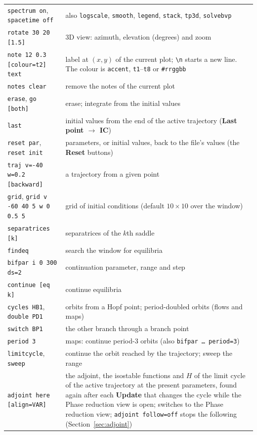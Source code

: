 \documentclass[11pt,a4paper]{article}
\newcommand{\ui}[1]{\textsf{\textbf{#1}}}          %
\begin{document}
{\begin{longtable}{@{}p{}p{}@{}}
\texttt{spectrum on}, \texttt{spacetime off} & also \texttt{logscale}, \texttt{smooth}, \texttt{legend}, \texttt{stack}, \texttt{tp3d}, \texttt{solvebvp}\\
\texttt{rotate 30 20 [1.5]} & 3D view: azimuth, elevation (degrees) and zoom\\
\texttt{note 12 0.3 [colour=t2] text} & label at $(x,y)$ of the current plot; \texttt{\textbackslash n} starts a new line. The colour is \texttt{accent}, \texttt{t1}--\texttt{t8} or \texttt{\#rrggbb}\\
\texttt{notes clear} & remove the notes of the current plot\\
\midrule
\texttt{erase}, \texttt{go [both]} & erase; integrate from the initial values\\
\texttt{last} & initial values from the end of the active trajectory (\ui{Last point $\to$ IC})\\
\texttt{reset par}, \texttt{reset init} & parameters, or initial values, back to the file's values (the \ui{Reset} buttons)\\
\texttt{traj v=-40 w=0.2 [backward]} & a trajectory from a given point\\
\texttt{grid}, \texttt{grid v -60 40 5 w 0 0.5 5} & grid of initial conditions (default $10\times10$ over the window)\\
\texttt{separatrices [k]} & separatrices of the $k$th saddle\\
\texttt{findeq} & search the window for equilibria\\
\midrule
\texttt{bifpar i 0 300 ds=2} & continuation parameter, range and step\\
\texttt{continue [eq k]} & continue equilibria\\
\texttt{cycles HB1}, \texttt{double PD1} & orbits from a Hopf point; period-doubled orbits (flows and maps)\\
\texttt{switch BP1} & the other branch through a branch point\\
\texttt{period 3} & maps: continue period-3 orbits (also \texttt{bifpar \ldots{} period=3})\\
\texttt{limitcycle}, \texttt{sweep} & continue the orbit reached by the trajectory; sweep the range\\
\texttt{adjoint here [align=VAR]} & the adjoint, the isostable functions and $H$ of the limit cycle of the active trajectory at the present parameters, found again after each \ui{Update} that changes the cycle while the Phase reduction view is open; switches to the Phase reduction view; \texttt{adjoint follow=off} stops the following (Section~\ref{sec:adjoint})\\

\end{longtable}}
\end{document}
